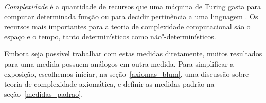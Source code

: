 \emph{Complexidade} é a quantidade de recursos
que uma máquina de Turing gasta
para computar determinada função
ou para decidir pertinência a uma linguagem
\cite[p.~285]{HopcroftUllman1979}.
Os recursos mais importantes para a teoria de complexidade computacional
são o espaço e o tempo,
tanto determinísticos como não"-determinísticos.

Embora seja possível trabalhar com estas medidas diretamente,
muitos resultados para uma medida
possuem análogos em outra medida.
Para simplificar a exposição,
escolhemos iniciar,
na seção~\ref{axiomas_blum},
uma discussão sobre teoria de complexidade axiomática,
e definir as medidas padrão na seção~\ref{medidas_padrao}.
